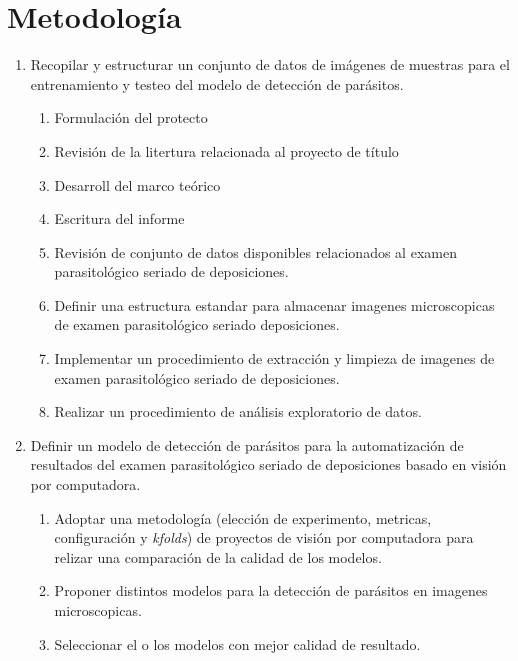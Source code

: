 \documentclass[letter,12pt]{report}
\begin{document}
\section{Metodología}
\begin{enumerate}\justifying
    \item Recopilar y estructurar un conjunto de datos de imágenes de muestras para el entrenamiento y testeo del modelo de detección de parásitos.
        \begin{enumerate}
            \item Formulación del protecto
            \item Revisión de la litertura relacionada al proyecto de título
            \item Desarroll del marco teórico
            \item Escritura del informe
            \item Revisión de conjunto de datos disponibles relacionados al examen
                parasitológico seriado de deposiciones.
            \item Definir una estructura estandar para almacenar imagenes microscopicas
                de examen parasitológico seriado deposiciones.
            \item Implementar un procedimiento de extracción y limpieza de imagenes de
                examen parasitológico seriado de deposiciones.
            \item Realizar un procedimiento de análisis exploratorio de datos.
        \end{enumerate}

  \item Definir un modelo de detección de parásitos para la automatización de resultados del examen parasitológico seriado de deposiciones basado en visión por computadora.
      \begin{enumerate}
          \item Adoptar una metodología (elección de experimento, metricas, configuración
              y \textit{kfolds}) de proyectos de visión por computadora para relizar una
              comparación de la calidad de los modelos.
          \item Proponer distintos modelos para la detección de parásitos en imagenes
              microscopicas.
          \item Seleccionar el o los modelos con mejor calidad de resultado.
      \end{enumerate}


\end{enumerate}
\end{document}
